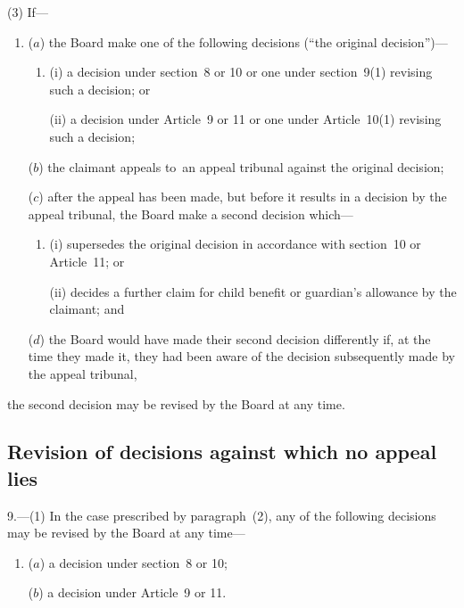 \documentclass[12pt,a4paper]{article}
\begin{document}
(3) If—
\begin{enumerate}\item[]
($a$) the Board make one of the following decisions (“the original decision”)—
\begin{enumerate}\item[]
(i) a decision under section~8 or 10 or one under section~9(1) revising such a decision; or

(ii) a decision under Article~9 or 11 or one under Article~10(1) revising such a decision;
\end{enumerate}

($b$) the claimant appeals to~an appeal tribunal against the original decision;

($c$) after the appeal has been made, but before it results in a decision by the appeal tribunal, the Board make a second decision which—
\begin{enumerate}\item[]
(i) supersedes the original decision in accordance with section~10 or Article~11; or

(ii) decides a further claim for child benefit or guardian’s allowance by the claimant; and
\end{enumerate}

($d$) the Board would have made their second decision differently if, at the time they made it, they had been aware of the decision subsequently made by the appeal tribunal,
\end{enumerate}
the second decision may be revised by the Board at any time.

\subsection[9. Revision of decisions against which no appeal lies]{Revision of decisions against which no appeal lies}

9.---(1)  In the case prescribed by paragraph~(2), any of the following decisions may be revised by the Board at any time—
\begin{enumerate}\item[]
($a$) a decision under section~8 or 10;

($b$) a decision under Article~9 or 11.
\end{enumerate}
\end{document}
